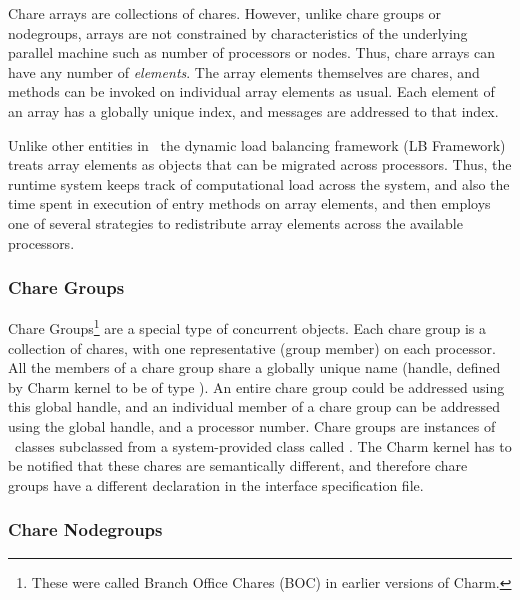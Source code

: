 Chare arrays are collections of chares. However, unlike chare groups or
nodegroups, arrays are not constrained by characteristics of the underlying
parallel machine such as number of processors or nodes. Thus, chare arrays
can have any number of {\em elements}. The array elements themselves are
chares, and methods can be invoked on individual array elements as usual.  
Each element of an array has a globally unique index, and messages are
addressed to that index.

Unlike other entities in \charmpp\, the dynamic load balancing framework (LB
Framework) treats array elements as objects that can be migrated across
processors. Thus, the runtime system keeps track of computational load
across the system, and also the time spent in execution of entry methods on
array elements, and then employs one of several strategies to redistribute
array elements across the available processors.

\subsubsection{Chare Groups}

Chare Groups\footnote{ These were called Branch Office Chares (BOC) in earlier
versions of Charm.} are a special type of concurrent objects.  Each chare group
is a collection of chares, with one representative (group member) on each
processor. All the members of a chare group share a globally unique name
(handle, defined by Charm kernel to be of type ). An entire chare
group could be addressed using this global handle, and an individual member of
a chare group can be addressed using the global handle, and a processor number.
Chare groups are instances of \CC\ classes subclassed from a system-provided
class called . The Charm kernel has to be notified that these chares
are semantically different, and therefore chare groups have a different
declaration in the interface specification file.

\subsubsection{Chare Nodegroups}

